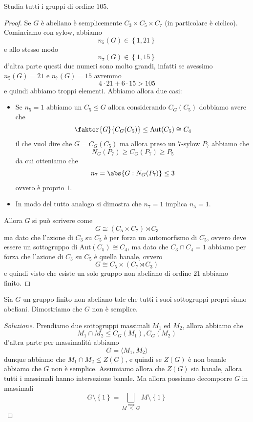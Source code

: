 \documentclass[11pt]{scrartcl}
\newcommand{\normal}{\mathrel{\unlhd}}
\begin{document}
	\begin{exercise}
		Studia tutti i gruppi di ordine $105$.
	\end{exercise}
	\begin{proof}
		Se $G$ è abeliano è semplicemente $C_3\times C_5\times C_7$ (in particolare è ciclico). Cominciamo con sylow, abbiamo
		$$n_5(G)\in \left\{1,21\right\}$$
		e allo stesso modo
		$$n_7(G)\in \left\{1,15\right\}$$
		d'altra parte questi due numeri sono molto grandi, infatti se avessimo $n_5(G)=21$ e $n_7(G)=15$ avremmo 
		$$4\cdot 21+6\cdot 15 > 105$$
		e quindi abbiamo troppi elementi. Abbiamo allora due casi:
		\begin{itemize}
			\item Se $n_5=1$ abbiamo un $C_5\normal G$ allora considerando $C_G(C_5)$ dobbiamo avere che 
			$$\faktor{G}{C_G(C_5)}\le \text{Aut}(C_5)\cong C_4$$
			il che vuol dire che $G=C_G(C_5)$ ma allora preso un $7$-sylow $P_7$ abbiamo che 
			$$N_G(P_7)\ge C_G(P_7)\ge P_5$$
			da cui otteniamo che 
			$$n_7=\abs{G:N_G(P_7)}\le 3$$
			ovvero è proprio $1$.
			\item In modo del tutto analogo si dimostra che $n_7=1$ implica $n_5=1$.
		\end{itemize}
		Allora $G$ si può scrivere come
		$$G\cong \left(C_5\times C_7\right)\rtimes C_3$$
		ma dato che l'azione di $C_3$ su $C_5$ è per forza un automorfismo di $C_5$, ovvero deve essere un sottogruppo di $\text{Aut}(C_5)\cong C_4$, ma dato che $C_3\cap C_4=1$ abbiamo per forza che l'azione di $C_3$ su $C_5$ è quella banale, ovvero
		$$G\cong C_5\times \left(C_7\rtimes C_3\right)$$
		e quindi visto che esiste un solo gruppo non abeliano di ordine $21$ abbiamo finito.
	\end{proof}
	
	\begin{exercise}
		Sia $G$ un gruppo finito non abeliano tale che tutti i suoi sottogruppi propri siano abeliani. Dimostriamo che $G$ non è semplice.
	\end{exercise}
	\begin{proof}[Soluzione]
		Prendiamo due sottogruppi massimali $M_1$ ed $M_2$, allora abbiamo che 
		$$M_1\cap M_2 \le C_G(M_1),C_G(M_2)$$
		d'altra parte per massimalità abbiamo
		$$G=\langle M_1,M_2\rangle$$
		dunque abbiamo che $M_1\cap M_2\le Z(G)$, e quindi se $Z(G)$ è non banale abbiamo che $G$ non è semplice. Assumiamo allora che $Z(G)$ sia banale, allora tutti i massimali hanno intersezione banale. Ma allora possiamo decomporre $G$ in massimali
		$$G\setminus \left\{1\right\}=\bigsqcup_{M\overset{max}{\le} G} M\setminus\left\{1\right\} $$
	\end{proof}
	
\end{document}
